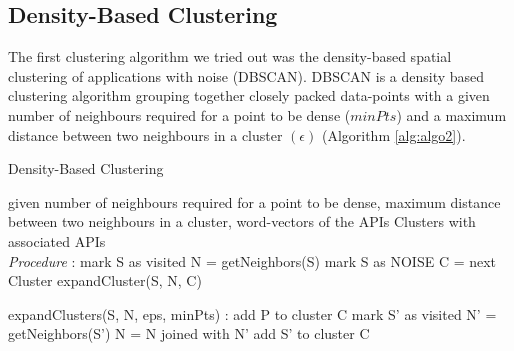 \documentclass[a4paper]{IEEEtran}
\begin{document}
\subsection{Density-Based Clustering}
The first clustering algorithm we tried out was the density-based spatial clustering of applications with noise (DBSCAN). DBSCAN\cite{dbscikit} is a density based clustering algorithm grouping together closely packed data-points with a given number of neighbours required for a point to be dense ($minPts$) and a maximum distance between two neighbours in a cluster $(\epsilon)$ (Algorithm \ref{alg:algo2}). 

\begin{algorithm}[H]
\caption{Density-Based Clustering}
\label{alg:algo2}
 \begin{algorithmic}[1]
\renewcommand{\algorithmicrequire}{\textbf{Input:}}
 \renewcommand{\algorithmicensure}{\textbf{Output:}}
 \REQUIRE given number of neighbours required for a point to be dense, \newline maximum distance between two
neighbours in a cluster, \newline word-vectors of the APIs
 \ENSURE  Clusters with associated APIs
 \\ \textit{Procedure} :
\STATE mark S as visited
\STATE N = getNeighbors(S)
\STATE mark S as NOISE
\ELSE
\STATE C = next Cluster
\STATE expandCluster(S, N, C)
\ENDIF
\ENDFOR
\newline
 \end{algorithmic}
 \begin{algorithmic}[2]
 \STATE expandClusters(S, N, eps, minPts) :
\STATE add P to cluster C 
\STATE mark S' as visited
\STATE N' = getNeighbors(S')
\STATE N = N joined with N'
\ENDIF
{}
\STATE add S' to cluster C
\ENDIF
\ENDFOR
 \end{algorithmic}
 \end{algorithm}
\end{document}
